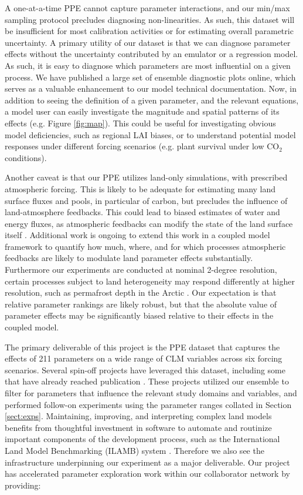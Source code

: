 \documentclass[draft]{agujournal2019}
\begin{document}
A one-at-a-time PPE cannot capture parameter interactions, and our min/max sampling protocol precludes diagnosing non-linearities. As such, this dataset will be insufficient for most calibration activities or for estimating overall parametric uncertainty. A primary utility of our dataset is that we can diagnose parameter effects without the uncertainty contributed by an emulator or a regression model. As such, it is easy to diagnose which parameters are most influential on a given process. We have published a large set of ensemble diagnostic plots online, which serves as a valuable enhancement to our model technical documentation. Now, in addition to seeing the definition of a given parameter, and the relevant equations, a model user can easily investigate the magnitude and spatial patterns of its effects (e.g. Figure \ref{fig:map}). This could be useful for investigating obvious model deficiencies, such as regional LAI biases, or to understand potential model responses under different forcing scenarios (e.g. plant survival under low CO$_2$ conditions).  

Another caveat is that our PPE utilizes land-only simulations, with prescribed atmospheric forcing. This is likely to be adequate for estimating many land surface fluxes and pools, in particular of carbon, but precludes the influence of land-atmosphere feedbacks. This could lead to biased estimates of water and energy fluxes, as atmospheric feedbacks can modify the state of the land surface itself \cite{lague2019}. Additional work is ongoing to extend this work in a coupled model framework to quantify how much, where, and for which processes atmospheric feedbacks are likely to modulate land parameter effects substantially. 
Furthermore our experiments are conducted at nominal 2-degree resolution, certain processes subject to land heterogeneity may respond differently at higher resolution, such as permafrost depth in the Arctic \cite{schickhoff2024}.
Our expectation is that relative parameter rankings are likely robust, but that the absolute value of parameter effects may be significantly biased relative to their effects in the coupled model. 

The primary deliverable of this project is the PPE dataset that captures the effects of 211 parameters on a wide range of CLM variables across six forcing scenarios. Several spin-off projects have leveraged this dataset, including some that have already reached publication \cite{cheng2023,yan2023a,yan2023b}. These projects utilized our ensemble to filter for parameters that influence the relevant study domains and variables, and performed follow-on experiments using the parameter ranges collated in Section \ref{sect:exps}. 
Maintaining, improving, and interpreting complex land models benefits from thoughtful investment in software to automate and routinize important components of the development process, such as the International Land Model Benchmarking (ILAMB) system \cite{collier2018}.
Therefore we also see the infrastructure underpinning our experiment as a major deliverable. Our project has accelerated parameter exploration work within our collaborator network by providing:
\end{document}
